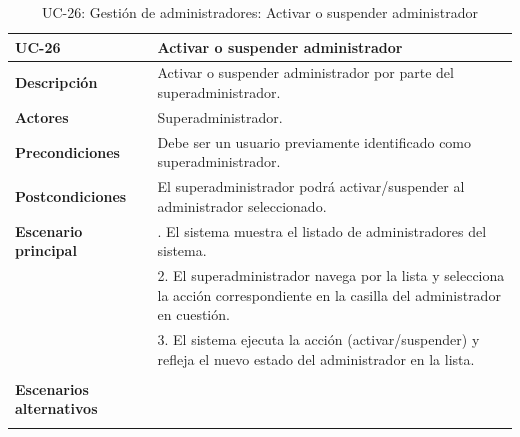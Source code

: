 \begin{table}
  \begin{center}
    \begin{tabularx}{16.4cm}{|l|X|}
      \hline
      \textbf{UC-26} & \textbf{Activar o suspender administrador}\\
      \hline
      \textbf{Descripción} & Activar o suspender administrador por parte del superadministrador. \\
      \hline
      \textbf{Actores} & Superadministrador.\\
      \hline
      \textbf{Precondiciones} & Debe ser un usuario previamente identificado como superadministrador.\\
      \hline
      \textbf{Postcondiciones} & El superadministrador podrá activar/suspender al administrador seleccionado.\\
      \hline
      \textbf{Escenario principal} & \smallskip 1. El sistema muestra el listado de administradores del sistema.\\
      & 2. El superadministrador navega por la lista y selecciona la acción correspondiente en la casilla del administrador en cuestión.\\
      & 3. El sistema ejecuta la acción (activar/suspender) y refleja el nuevo estado del administrador en la lista. \\
      & \\
      \hline
      \textbf{Escenarios alternativos} & \\
      & \\
      \hline
    \end{tabularx}
    \caption{UC-26: Gestión de administradores: Activar o suspender administrador}
    \label{tab:CU-activar-suspender-admin}
  \end{center}
\end{table}


